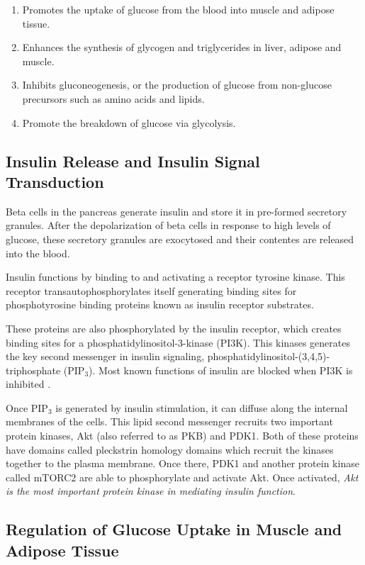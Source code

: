 \documentclass{tufte-handout}
\begin{document}
\begin{enumerate}
\item Promotes the uptake of glucose from the blood into muscle and adipose tissue.  
\item Enhances the synthesis of glycogen and triglycerides in liver, adipose and muscle.  
\item Inhibits gluconeogenesis, or the production of glucose from non-glucose precursors such as amino acids and lipids.
\item Promote the breakdown of glucose via glycolysis.
\end{enumerate}

\subsection{Insulin Release and Insulin Signal Transduction}

Beta cells in the pancreas generate insulin and store it in pre-formed secretory granules.  After the depolarization of beta cells in response to high levels of glucose, these secretory granules are exocytosed and their contentes are released into the blood.

Insulin functions by binding to and activating a receptor tyrosine kinase.  This receptor transautophosphorylates itself generating binding sites for phosphotyrosine binding proteins known as insulin receptor substrates.

These proteins are also phosphorylated by the insulin receptor, which creates binding sites for a phosphatidylinositol-3-kinase (PI3K).  This kinases generates the key second messenger in insulin signaling, phosphatidylinositol-(3,4,5)-triphosphate (PIP$_3$).  Most known functions of insulin are blocked when PI3K is inhibited \cite{Kanai1993}.

Once PIP$_3$ is generated by insulin stimulation, it can diffuse along the internal membranes of the cells.  This lipid second messenger recruits two important protein kinases, Akt (also referred to as PKB) and PDK1.  Both of these proteins have domains called pleckstrin homology domains which recruit the kinases together to the plasma membrane.  Once there, PDK1 and another protein kinase called mTORC2 are able to phosphorylate and activate Akt.  Once activated, \emph{Akt is the most important protein kinase in mediating insulin function}.

\subsection{Regulation of Glucose Uptake in Muscle and Adipose Tissue}
\end{document}
